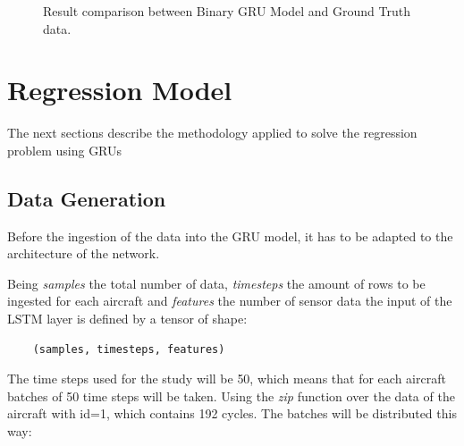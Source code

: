 \begin{figure}
\begin{center}
\end{center}
\decoRule
\caption[Result comparison between Binary GRU Model and Ground Truth data]{Result comparison between Binary GRU Model and Ground Truth data.}
\label{fig:binary-gru-results}
\end{figure}


\section{Regression Model}

The next sections describe the methodology applied to solve the regression problem using GRUs


\subsection{Data Generation}

Before the ingestion of the data into the GRU model, it has to be adapted to the architecture of the network.

Being \textit{samples} the total number of data, \textit{timesteps} the amount of rows to be ingested for each aircraft and \textit{features} the number of sensor data the input of the LSTM layer is defined by a tensor of shape:

\begin{verbatim}
    (samples, timesteps, features)
\end{verbatim}

The time steps used for the study will be 50, which means that for each aircraft batches of 50 time steps will be taken.
Using the \textit{zip} function over the data of the aircraft with id=1, which contains 192 cycles. The batches will be distributed this way:

